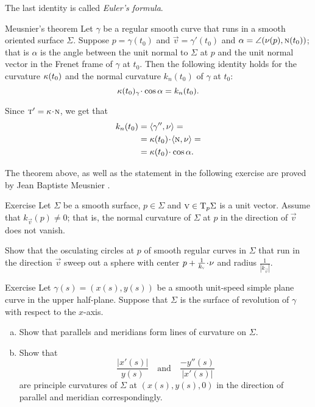 The last identity is called \emph{Euler's formula}.


\begin{thm}{Meusnier's theorem}\label{thm:meusnier}
Let $\gamma$ be a regular smooth curve that runs in a smooth oriented surface $\Sigma$.
Suppose $p=\gamma(t_0)$ and ${\vec v}=\gamma'(t_0)$ and $\alpha=\angle(\nu(p),\textsc{n}(t_0))$;
that is $\alpha$ is the angle between the unit normal to $\Sigma$ at $p$ and the unit normal vector in the Frenet frame of $\gamma$ at $t_0$.
Then the following identity holds for the curvature $\kappa(t_0)$ and the normal curvature $k_n(t_0)$ of $\gamma$ at $t_0$:  
\[\kur(t_0)_\gamma\cdot\cos\alpha=k_{n}(t_0).\]

\end{thm}


 Since $\tan'=\kur\cdot \norm$, we get that
\begin{align*}
k_{n}(t_0)&=\langle\gamma'',\Norm\rangle=
\\
&=\kur(t_0)\cdot\langle\norm,\Norm\rangle=
\\
&=\kur(t_0)\cdot\cos\alpha.
\end{align*}
\qedsf

The theorem above, as well as the statement in the following exercise are proved by Jean Baptiste Meusnier \cite{meusnier}.

\begin{thm}{Exercise}\label{ex:meusnier}
Let $\Sigma$ be a smooth surface, $p\in\Sigma$ and ${\textsc v}\in \mathrm{T}_p\Sigma$ is a unit vector.
Assume that $k_{\vec v}(p)\ne 0$; that is, the normal curvature of $\Sigma$ at $p$ in the direction of ${\vec v}$ does not vanish.

Show that the osculating circles at $p$ of smooth regular curves in $\Sigma$ that run in the direction ${\vec v}$ sweep out a sphere with center $p+\tfrac1{k_{\vec v}}\cdot\Norm$ and radius $\tfrac1{|k_{\vec v}|}$.
\end{thm}

\begin{thm}{Exercise}\label{ex:principle-revolution}
Let $\gamma(s)=(x(s),y(s))$ be a smooth unit-speed simple plane curve in the upper half-plane.
Suppose that $\Sigma$ is the surface of revolution of $\gamma$ with respect to the $x$-axis.

\begin{enumerate}[(a)]
\item Show that parallels and meridians form lines of curvature on $\Sigma$.
\item Show that 
\[\frac{|x'(s)|}{y(s)}
\quad
\text{and}
\quad
\frac{-y''(s)}{|x'(s)|}
\]
are principle curvatures of $\Sigma$ at $(x(s),y(s),0)$ in the direction of parallel and meridian correspondingly.
\end{enumerate}

\end{thm}

